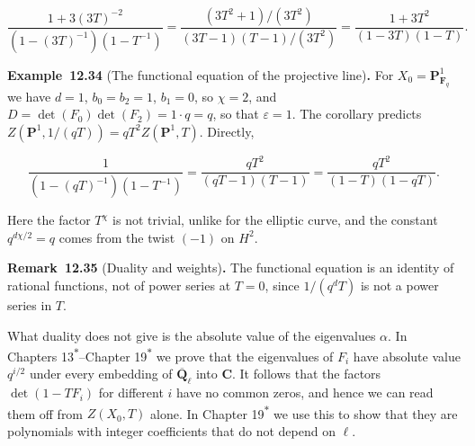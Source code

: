 \documentclass[11pt]{article}
\newenvironment{bpstatement}[2]{\par\addvspace{0.6\baselineskip}\noindent\textbf{#1}#2\textbf{.}\enspace\ignorespaces}
  {\par\addvspace{0.4\baselineskip}}
\newcommand{\bpout}[1]{#1\textsuperscript{\hyperlink{bp-outside}{\ensuremath{\ast}}}}
\begin{document}
\[
\frac{1+3(3T)^{-2}}{(1-(3T)^{-1})(1-T^{-1})}
=\frac{(3T^2+1)/(3T^2)}{(3T-1)(T-1)/(3T^2)}
=\frac{1+3T^2}{(1-3T)(1-T)}.
\]

\label{bp103}%
\begin{bpstatement}{Example~12.34}{ (The functional equation of the projective line)}
For \(X_0=\mathbf P^1_{\mathbf F_q}\) we have \(d=1\), \(b_0=b_2=1\), \(b_1=0\), so \(\chi=2\), and \(D=\det(F_0)\det(F_2)=1\cdot q=q\), so that \(\varepsilon=1\). The corollary predicts \(Z(\mathbf P^1,1/(qT))=qT^2Z(\mathbf P^1,T)\). Directly,

\[
\frac1{(1-(qT)^{-1})(1-T^{-1})}
=\frac{qT^2}{(qT-1)(T-1)}
=\frac{qT^2}{(1-T)(1-qT)}.
\]

Here the factor \(T^{\chi}\) is not trivial, unlike for the elliptic curve, and the constant \(q^{d\chi/2}=q\) comes from the twist \((-1)\) on \(H^2\).
\end{bpstatement}

\label{bp104}%
\begin{bpstatement}{Remark~12.35}{ (Duality and weights)}
The functional equation is an identity of rational functions, not of power series at \(T=0\), since \(1/(q^dT)\) is not a power series in \(T\).

What duality does not give is the absolute value of the eigenvalues \(\alpha\). In Chapters \bpout{13}–\bpout{Chapter 19} we prove that the eigenvalues of \(F_i\) have absolute value \(q^{i/2}\) under every embedding of \(\overline{\mathbf Q}_\ell\) into \(\mathbf C\). It follows that the factors \(\det(1-TF_i)\) for different \(i\) have no common zeros, and hence we can read them off from \(Z(X_0,T)\) alone. In Chapter \bpout{19} we use this to show that they are polynomials with integer coefficients that do not depend on \(\ell\).
\end{bpstatement}



\clearpage{}\hypertarget{bp-outside}{}%
\end{document}
